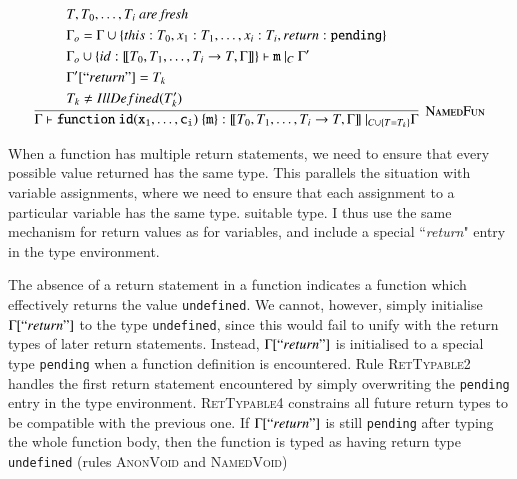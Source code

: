 \documentclass[12pt,a4paper,twoside,openright]{report}
\theoremstyle{definition}
\theoremstyle{dotless}
\newcommand*{\js}{\texttt}
\begin{document}
$$\infer[\textsc{NamedFun}]{
  \Gamma\vdash\mathtt{function\ id(x_1, \dots, c_i)\ \{m\}}:[\![T_0, T_1, \dots, T_i\rightarrow T, \Gamma]\!]\ |_{C\cup \{T=T_k\}} \Gamma
}{
  \begin{split}
	&T, T_0, \dots, T_i\textit{ are fresh} \\
  	&\Gamma_o = \Gamma\cup\{this:T_0, x_1:T_1, \dots, x_i:T_i, return: \mathtt{pending}\} \\ 
	& \Gamma_o\cup \{ id: [\![T_0, T_1, \dots, T_i\rightarrow T, \Gamma]\!]\} \vdash \mathtt{m}\ |_C\ \Gamma'\\
  	&\Gamma'[``return"] = T_k \\
	&T_k \neq IllDefined(T_k')
  \end{split}
}$$

When a function has multiple return statements, we need to ensure that every
possible value returned has the same type.  This parallels the situation with
variable assignments, where we need to ensure that each assignment to a
particular variable has the same type.  suitable type. I thus use the same
mechanism for return values as for variables, and include a special
``\textit{return}" entry in the type environment. 

The absence of a return statement in a function indicates a function which
effectively returns the value \js{undefined}.  We cannot, however, simply
initialise $\Gamma[``return"]$ to the type \texttt{undefined}, since this would
fail to unify with the return types of later return statements.  Instead,
$\Gamma[``return"]$ is initialised to a special type \texttt{pending} when a
function definition is encountered. Rule \textsc{RetTypable2} handles the first
return statement encountered by simply overwriting the \texttt{pending} entry
in the type environment. \textsc{RetTypable4} constrains all future return
types to be compatible with the previous one.  If $\Gamma[``return"]$ is still
\texttt{pending} after typing the whole function body, then the function is
typed as having return type \texttt{undefined} (rules \textsc{AnonVoid} and
\textsc{NamedVoid})
\end{document}
